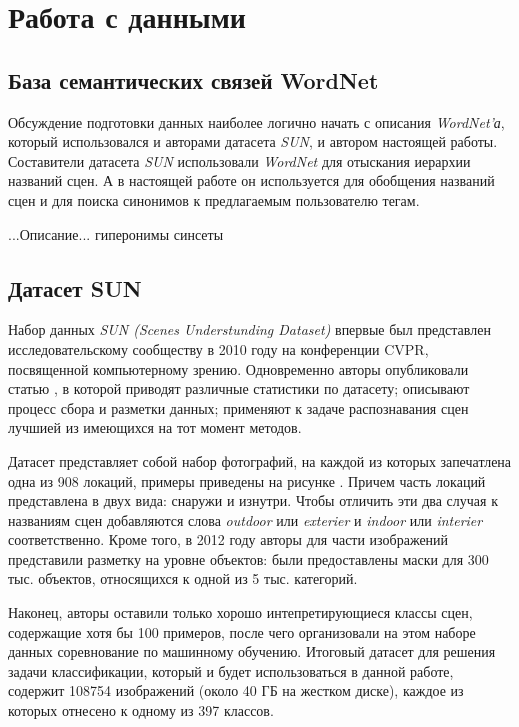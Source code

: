 \section{Работа с данными}



\subsection{База семантических связей WordNet}

\indent
\indent
Обсуждение подготовки данных наиболее логично начать с описания 
\textit{WordNet'а}, который использовался и авторами датасета \textit{SUN},
и автором настоящей работы. Составители датасета \textit{SUN} использовали
\textit{WordNet} для отыскания иерархии названий сцен. А в настоящей работе
он используется для обобщения названий сцен и для поиска синонимов
к предлагаемым пользователю тегам.

\indent
...Описание...
гиперонимы
синсеты


\subsection{Датасет SUN}

\indent
\indent
Набор данных \textit{SUN (Scenes Understunding Dataset)} впервые был 
представлен исследовательскому сообществу в 2010 году на 
конференции CVPR, посвященной компьютерному зрению. Одновременно
авторы опубликовали статью \cite{sundata}, в которой приводят различные
статистики по датасету; описывают процесс сбора и разметки данных; 
применяют к задаче распознавания сцен лучшией из имеющихся
на тот момент методов. 

\indent 
Датасет представляет собой набор фотографий, на каждой из которых запечатлена
одна из 908 локаций, примеры приведены на рисунке \cite{tikzpicture: sun}. Причем
часть локаций представлена в двух
вида: снаружи и изнутри. Чтобы отличить эти два случая к названиям сцен добавляются слова \textit{outdoor} или \textit{exterier} и \textit{indoor} или \textit{interier} соответственно.
Кроме того, в 2012 году авторы для части изображений представили разметку 
на уровне объектов: были предоставлены маски для 300 тыс. объектов, относящихся
к одной из 5 тыс. категорий.

\indent
Наконец, авторы оставили только хорошо интепретирующиеся классы сцен, 
содержащие хотя бы 100 примеров, после чего организовали на этом
наборе данных соревнование по машинному обучению. Итоговый датасет
для решения задачи классификации,
который и будет использоваться в данной работе,
содержит 108754 изображений (около 40 ГБ на жестком диске), каждое 
из которых отнесено к одному из 397 классов.

